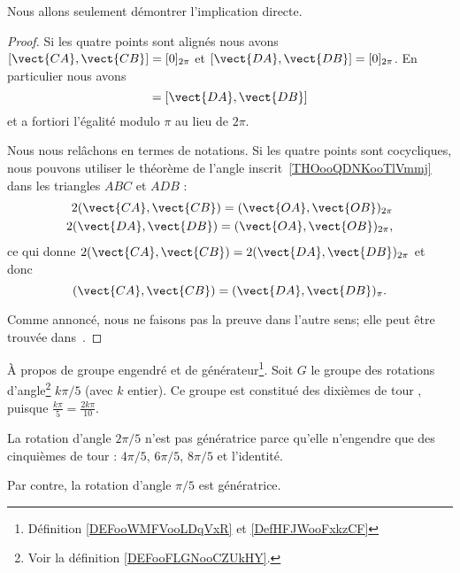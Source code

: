 Nous allons seulement démontrer l'implication directe.
\begin{proof}
	Si les quatre points sont alignés nous avons \( [\vect{ CA },\vect{ CB }]=[0]_{2\pi}\) et \( [\vect{ DA },\vect{ DB }]=[0]_{2\pi}\). En particulier nous avons
	\begin{equation}
		[\vect{ CA },\vect{ CB }]=[\vect{ DA },\vect{ DB }]
	\end{equation}
	et a fortiori l'égalité modulo \( \pi\) au lieu de \( 2\pi\).

	Nous nous relâchons en termes de notations. Si les quatre points sont cocycliques, nous pouvons utiliser le théorème de l'angle inscrit~\ref{THOooQDNKooTlVmmj} dans les triangles \( ABC\) et \( ADB\) :
	\begin{subequations}
		\begin{align}
			2(\vect{ CA },\vect{ CB })=(\vect{ OA },\vect{ OB })_{2\pi} \\
			2(\vect{ DA },\vect{ DB })=(\vect{ OA },\vect{ OB })_{2\pi},
		\end{align}
	\end{subequations}
	ce qui donne \(  2(\vect{ CA },\vect{ CB })=2(\vect{ DA },\vect{ DB })_{2\pi}  \) et donc
	\begin{equation}
		(\vect{ CA },\vect{ CB })=(\vect{ DA },\vect{ DB })_{\pi}.
	\end{equation}

	Comme annoncé, nous ne faisons pas la preuve dans l'autre sens; elle peut être trouvée dans~\cite{ooRGSCooNgALYH}.
\end{proof}

\begin{example}     \label{EXooOXAAooZMdDfP}
	À propos de groupe engendré et de générateur\footnote{Définition \ref{DEFooWMFVooLDqVxR} et \ref{DefHFJWooFxkzCF}}. Soit \( G\) le groupe des rotations d'angle\footnote{Voir la définition \ref{DEFooFLGNooCZUkHY}.} \( k\pi/5\) (avec \( k \) entier). Ce groupe est constitué des \og{} dixièmes de tour \fg{}, puisque \( \frac{k\pi} 5 = \frac{2k\pi}{10}.\)

	La rotation d'angle \( 2 \pi/5\)  n'est pas génératrice parce qu'elle n'engendre que des \og{} cinquièmes de tour \fg{} : \( 4 \pi/5\), \( 6 \pi/ 5\), \( 8\pi/5\) et l'identité.

	Par contre, la rotation d'angle \( \pi/5\) est génératrice.
\end{example}

